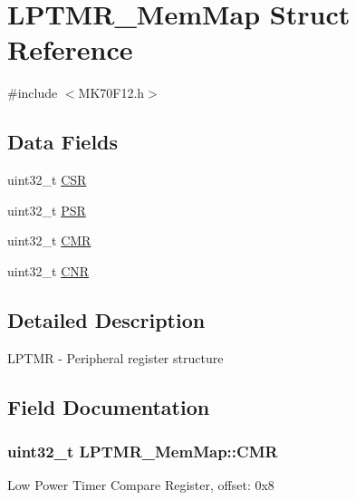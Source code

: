 \hypertarget{struct_l_p_t_m_r___mem_map}{}\section{L\+P\+T\+M\+R\+\_\+\+Mem\+Map Struct Reference}
\label{struct_l_p_t_m_r___mem_map}


{\ttfamily \#include $<$M\+K70\+F12.\+h$>$}

\subsection*{Data Fields}
\begin{DoxyCompactItemize}
\item 
uint32\+\_\+t \hyperlink{struct_l_p_t_m_r___mem_map_a4dcb593756f09d67e3d064d95e3f2d68}{C\+S\+R}
\item 
uint32\+\_\+t \hyperlink{struct_l_p_t_m_r___mem_map_a05f0c5c90722e5a1757c262c818d2462}{P\+S\+R}
\item 
uint32\+\_\+t \hyperlink{struct_l_p_t_m_r___mem_map_a28ac745e518d40e34527f5cf70f75d70}{C\+M\+R}
\item 
uint32\+\_\+t \hyperlink{struct_l_p_t_m_r___mem_map_adda036ea26ea5cc89d7957779c5680f0}{C\+N\+R}
\end{DoxyCompactItemize}


\subsection{Detailed Description}
L\+P\+T\+M\+R -\/ Peripheral register structure 

\subsection{Field Documentation}
\hypertarget{struct_l_p_t_m_r___mem_map_a28ac745e518d40e34527f5cf70f75d70}{}
\subsubsection[{C\+M\+R}]{\setlength{\rightskip}{0pt plus 5cm}uint32\+\_\+t L\+P\+T\+M\+R\+\_\+\+Mem\+Map\+::\+C\+M\+R}\label{struct_l_p_t_m_r___mem_map_a28ac745e518d40e34527f5cf70f75d70}
Low Power Timer Compare Register, offset\+: 0x8 \hypertarget{struct_l_p_t_m_r___mem_map_adda036ea26ea5cc89d7957779c5680f0}{}
